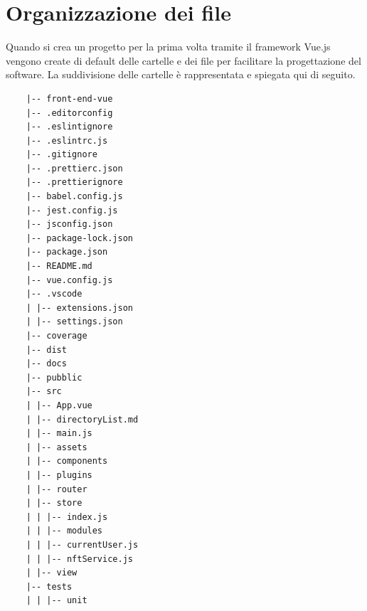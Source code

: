 \section{Organizzazione dei file}
Quando si crea un progetto per la prima volta tramite il framework Vue.js vengono create di default delle cartelle e dei file per facilitare la progettazione del software. La suddivisione delle cartelle è rappresentata e spiegata qui di seguito.

\begin{lstlisting}
	|-- front-end-vue
	|-- .editorconfig
	|-- .eslintignore
	|-- .eslintrc.js
	|-- .gitignore
	|-- .prettierc.json
	|-- .prettierignore
	|-- babel.config.js
	|-- jest.config.js
	|-- jsconfig.json
	|-- package-lock.json
	|-- package.json
	|-- README.md
	|-- vue.config.js
	|-- .vscode
	| |-- extensions.json
	| |-- settings.json
	|-- coverage
	|-- dist
	|-- docs
	|-- pubblic
	|-- src
	| |-- App.vue
	| |-- directoryList.md
	| |-- main.js
	| |-- assets
	| |-- components
	| |-- plugins
	| |-- router
	| |-- store
	| | |-- index.js
	| | |-- modules
	| | |-- currentUser.js
	| | |-- nftService.js
	| |-- view
	|-- tests
	| | |-- unit
\end{lstlisting}

